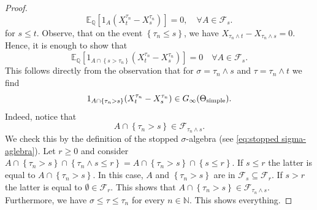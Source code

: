 \documentclass[11pt,a4paper,twoside,openany]{report}
\numberwithin{equation}{section}
\theoremstyle{plain} %
\theoremstyle{definition} %
\theoremstyle{remark} %
\begin{document}
\begin{proof}
\begin{equation*}
        \mathbb{E}_\mathbb{Q}[1_A(X^{\tau_n}_t-X^{\tau_n}_s)]=0,\quad \forall A\in\mathcal{F}_s.
    \end{equation*}
    for \(s\leq t\). Observe, that on the event \(\left\{\tau_n\leq s\right\}\), we have \(X_{\tau_n\wedge t}-X_{\tau_n\wedge s}=0\). Hence, it is enough to show that 
    \begin{equation*}
          \mathbb{E}_\mathbb{Q}[1_{A\cap \left\{s>\tau_n\right\}}(X^{\tau_n}_t-X^{\tau_n}_s)]=0\quad \forall A\in\mathcal{F}_s.
    \end{equation*}
    This follows directly from the observation that 
    for \(\sigma = \tau_n\wedge s\) and \(\tau = \tau_n\wedge t\) we find
    \begin{equation*}
        1_{A\cap\left\{\tau_n>s\right\}}(X^{\tau_n}_t-X^{\tau_n}_s)\in G_{\infty}(\Theta_{\rm{simple}}).
    \end{equation*}
    Indeed, notice that 
    \begin{equation*}
        A\cap\left\{\tau_n>s\right\}\in\mathcal{F}_{\tau_n\wedge s}.
    \end{equation*}
    We check this by the definition of the stopped \(\sigma\)-algebra (see \eqref{eq:stopped sigma-aglebra}). Let \(r\geq 0\) and consider \(A\cap\left\{\tau_n>s\right\}\cap\left\{\tau_n\wedge s\leq r\right\}=A\cap\left\{\tau_n>s\right\}\cap\left\{s\leq r\right\}\).
    If \(s\leq r\) the latter is equal to \(A\cap\left\{\tau_n>s\right\}\). In this case, \(A\) and \(\left\{\tau_n>s\right\}\) are in \(\mathcal{F}_s\subseteq\mathcal{F}_r\). If \(s>r\) the latter is equal to \(\emptyset\in\mathcal{F}_r\). This shows that \(A\cap\left\{\tau_n>s\right\}\in\mathcal{F}_{\tau_n\wedge s}\). Furthermore, we have \(\sigma\leq\tau\leq \tau_n\) for every \(n\in\mathbb{N}\). This shows everything.
     \end{proof}
     
\end{document}
